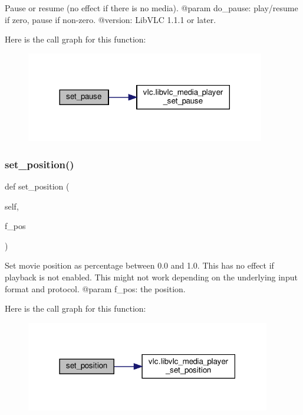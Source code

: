 \begin{DoxyVerb}Pause or resume (no effect if there is no media).
@param do_pause: play/resume if zero, pause if non-zero.
@version: LibVLC 1.1.1 or later.
\end{DoxyVerb}
 Here is the call graph for this function\+:
\nopagebreak
\begin{figure}[H]
\begin{center}
\leavevmode
\includegraphics[width=296pt]{classvlc_1_1_media_player_ab35d8dc9f1faad46ff204872a225ad49_cgraph}
\end{center}
\end{figure}
\mbox{\label{classvlc_1_1_media_player_a2f2e4eb910de57ea727afd175c2c67e3}} 
\subsubsection{\texorpdfstring{set\+\_\+position()}{set\_position()}}
{\footnotesize\ttfamily def set\+\_\+position (\begin{DoxyParamCaption}\item[{}]{self,  }\item[{}]{f\+\_\+pos }\end{DoxyParamCaption})}

\begin{DoxyVerb}Set movie position as percentage between 0.0 and 1.0.
This has no effect if playback is not enabled.
This might not work depending on the underlying input format and protocol.
@param f_pos: the position.
\end{DoxyVerb}
 Here is the call graph for this function\+:
\nopagebreak
\begin{figure}[H]
\begin{center}
\leavevmode
\includegraphics[width=303pt]{classvlc_1_1_media_player_a2f2e4eb910de57ea727afd175c2c67e3_cgraph}
\end{center}
\end{figure}
\mbox{\label{classvlc_1_1_media_player_ad50cf98b830498f40d70c8073683fedf}} 

